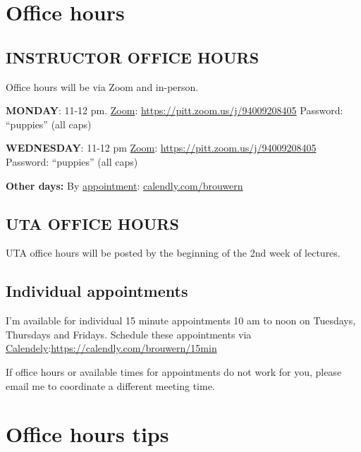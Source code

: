 \documentclass[
]{book}
\begin{document}
\hypertarget{office-hours}{%
\chapter{Office hours}\label{office-hours}}

\hypertarget{instructor-office-hours}{%
\section{INSTRUCTOR OFFICE HOURS}\label{instructor-office-hours}}

Office hours will be via Zoom and in-person.

\textbf{MONDAY}: 11-12 pm.
\href{https://pitt.zoom.us/j/94009208405}{Zoom}: \url{https://pitt.zoom.us/j/94009208405}
Password: ``puppies'' (all caps)

\textbf{WEDNESDAY}: 11-12 pm
\href{https://pitt.zoom.us/j/94009208405}{Zoom}: \url{https://pitt.zoom.us/j/94009208405}
Password: ``puppies'' (all caps)

\textbf{Other days:} By \href{calendly.com/brouwern}{appointment}: \url{calendly.com/brouwern}

\hypertarget{uta-office-hours}{%
\section{UTA OFFICE HOURS}\label{uta-office-hours}}

UTA office hours will be posted by the beginning of the 2nd week of lectures.

\hypertarget{individual-appointments}{%
\section{Individual appointments}\label{individual-appointments}}

I'm available for individual 15 minute appointments 10 am to noon on Tuesdays, Thursdays and Fridays. Schedule these appointments via \href{https://calendly.com/brouwern/15min}{Calendely}:\url{https://calendly.com/brouwern/15min}

If office hours or available times for appointments do not work for you, please email me to coordinate a different meeting time.

\hypertarget{office-hours-tips}{%
\chapter{Office hours tips}\label{office-hours-tips}}
\end{document}
